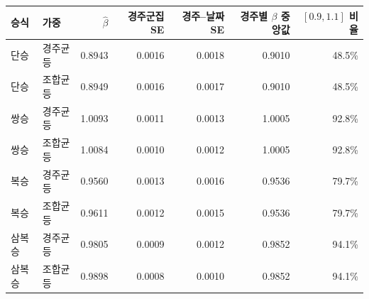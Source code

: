 \begin{tabular}{llrrrrr}
\toprule
승식 & 가중 & $\hat\beta$ & 경주군집 SE & 경주--날짜 SE & 경주별 $\beta$ 중앙값 & $[0.9,1.1]$ 비율 \\
\midrule
단승 & 경주균등 & 0.8943 & 0.0016 & 0.0018 & 0.9010 & 48.5\% \\
단승 & 조합균등 & 0.8949 & 0.0016 & 0.0017 & 0.9010 & 48.5\% \\
쌍승 & 경주균등 & 1.0093 & 0.0011 & 0.0013 & 1.0005 & 92.8\% \\
쌍승 & 조합균등 & 1.0084 & 0.0010 & 0.0012 & 1.0005 & 92.8\% \\
복승 & 경주균등 & 0.9560 & 0.0013 & 0.0016 & 0.9536 & 79.7\% \\
복승 & 조합균등 & 0.9611 & 0.0012 & 0.0015 & 0.9536 & 79.7\% \\
삼복승 & 경주균등 & 0.9805 & 0.0009 & 0.0012 & 0.9852 & 94.1\% \\
삼복승 & 조합균등 & 0.9898 & 0.0008 & 0.0010 & 0.9852 & 94.1\% \\
\bottomrule
\end{tabular}
